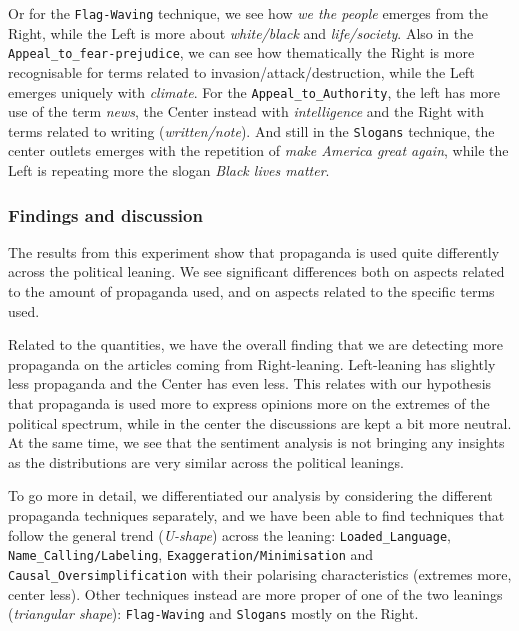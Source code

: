 Or for the \texttt{Flag-Waving} technique, we see how \emph{we the people} emerges from the Right, while the Left is more about \emph{white/black} and \emph{life/society}.
Also in the \texttt{Appeal\_to\_fear-prejudice}, we can see how thematically the Right is more recognisable for terms related to invasion/attack/destruction, while the Left emerges uniquely with \emph{climate}.
For the \texttt{Appeal\_to\_Authority}, the left has more use of the term \emph{news}, the Center instead with \emph{intelligence} and the Right with terms related to writing (\emph{written/note}).
And still in the \texttt{Slogans} technique, the center outlets emerges with the repetition of \emph{make America great again}, while the Left is repeating more the slogan \emph{Black lives matter}.

\subsubsection{Findings and discussion}

The results from this experiment show that propaganda is used quite differently across the political leaning.
We see significant differences both on aspects related to the amount of propaganda used, and on aspects related to the specific terms used.

Related to the quantities, we have the overall finding that we are detecting more propaganda on the articles coming from Right-leaning.
Left-leaning has slightly less propaganda and the Center has even less.
This relates with our hypothesis that propaganda is used more to express opinions more on the extremes of the political spectrum, while in the center the discussions are kept a bit more neutral.
At the same time, we see that the sentiment analysis is not bringing any insights as the distributions are very similar across the political leanings.

To go more in detail, we differentiated our analysis by considering the different propaganda techniques separately, and we have been able to find techniques that follow the general trend (\emph{U-shape}) across the leaning: \texttt{Loaded\_Language}, \texttt{Name\_Calling/Labeling}, \texttt{Exaggeration/Minimisation} and \texttt{Causal\_Oversimplification} with their polarising characteristics (extremes more, center less). Other techniques instead are more proper of one of the two leanings (\emph{triangular shape}): \texttt{Flag-Waving} and \texttt{Slogans} mostly on the Right. 


